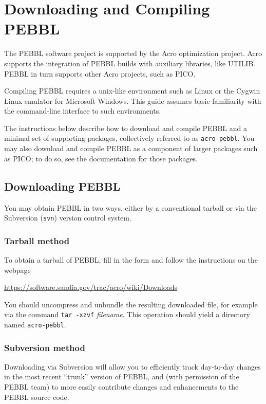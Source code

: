 \section{Downloading and Compiling PEBBL}
\label{sec:downloadcompile}
The PEBBL software project is supported by the Acro optimization
project.  Acro supports the integration of PEBBL builds with auxiliary
libraries, like UTILIB.  PEBBL in turn supports other Acro projects,
such as PICO.

Compiling PEBBL requires a unix-like environment such as Linux or the
Cygwin Linux emulator for Microsoft Windows.  This guide assumes basic
familiarity with the command-line interface to such environments.

The instructions below describe how to download and compile PEBBL and
a minimal set of supporting packages, collectively referred to as
\texttt{acro-pebbl}.  You may also download and compile PEBBL as a
component of larger packages such as PICO; to do so, see the
documentation for those packages.


\subsection{Downloading PEBBL}
\label{sec:download}
You may obtain PEBBL in two ways, either by a conventional tarball or
via the Subversion (\texttt{svn}) version control system.  

\subsubsection{Tarball method}
To obtain a tarball of PEBBL, fill in the form and follow the
instructions on the webpage
\begin{center}
\url{https://software.sandia.gov/trac/acro/wiki/Downloads}
\end{center}
You should uncompress and unbundle the resulting downloaded file, for
example via the command \texttt{tar -xzvf} \emph{filename}.  This
operation should yield a directory named \texttt{acro-pebbl}.

\subsubsection{Subversion method}
Downloading via Subversion will allow you to efficiently track
day-to-day changes in the most recent ``trunk'' version of PEBBL, and
(with permission of the PEBBL team) to more easily contribute changes
and enhancements to the PEBBL source code.

